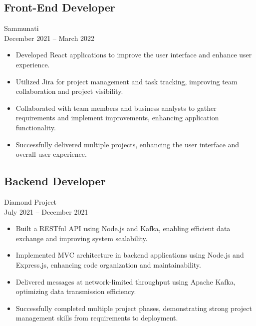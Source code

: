 \documentclass[10pt, letterpaper]{article}
\begin{document}
        \subsection{Front-End Developer}
            Sammunati \\
            December 2021 – March 2022
            \begin{itemize}[leftmargin=*]
                \item Developed React applications to improve the user interface and enhance user experience.
                \item Utilized Jira for project management and task tracking, improving team collaboration and project visibility.
                \item Collaborated with team members and business analysts to gather requirements and implement improvements, enhancing application functionality.
                \item Successfully delivered multiple projects, enhancing the user interface and overall user experience.
            \end{itemize}
        \subsection{Backend Developer}
            Diamond Project \\
            July 2021 – December 2021
            \begin{itemize}[leftmargin=*]
                \item Built a RESTful API using Node.js and Kafka, enabling efficient data exchange and improving system scalability.
                \item Implemented MVC architecture in backend applications using Node.js and Express.js, enhancing code organization and maintainability.
                \item Delivered messages at network-limited throughput using Apache Kafka, optimizing data transmission efficiency.
                \item Successfully completed multiple project phases, demonstrating strong project management skills from requirements to deployment.
            \end{itemize}
\end{document}
